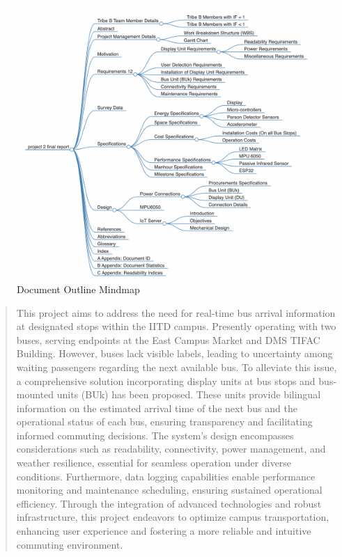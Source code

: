 \documentclass[12pt]{article} %
\begin{document}
\clearpage
\listoftables
\listoffigures

\clearpage

\begin{figure}
\centering
\includegraphics[scale=0.7]{mindmap.png}
\caption{Document Outline Mindmap}
    \label{fig:enter-label}
\end{figure}

\clearpage

\begin{abstract}
   This project aims to address the need for real-time bus arrival information at designated stops within the IITD campus. Presently operating with two buses, serving endpoints at the East Campus Market and DMS TIFAC Building. However, buses lack visible labels, leading to uncertainty among waiting passengers regarding the next available bus. To alleviate this issue, a comprehensive solution incorporating display units at bus stops and bus-mounted units (BUk) has been proposed. These units provide bilingual information on the estimated arrival time of the next bus and the operational status of each bus, ensuring transparency and facilitating informed commuting decisions. The system's design encompasses considerations such as readability, connectivity, power management, and weather resilience, essential for seamless operation under diverse conditions. Furthermore, data logging capabilities enable performance monitoring and maintenance scheduling, ensuring sustained operational efficiency. Through the integration of advanced technologies and robust infrastructure, this project endeavors to optimize campus transportation, enhancing user experience and fostering a more reliable and intuitive commuting environment.
    
\end{abstract}
\end{document}
